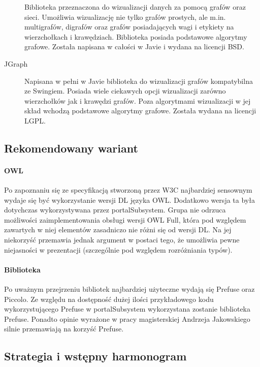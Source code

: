 \begin{description}
 Biblioteka przeznaczona do wizualizacji danych za pomocą grafów oraz sieci. Umożliwia wizualizację nie tylko grafów prostych, ale m.in. multigrafów, digrafów oraz grafów posiadających wagi i etykiety na wierzchołkach i krawędziach. Biblioteka posiada podstawowe algorytmy grafowe. Została napisana w całości w Javie i wydana na licencji BSD.
\item[JGraph]

 Napisana w pełni w Javie biblioteka do wizualizacji grafów kompatybilna ze Swingiem. Posiada wiele ciekawych opcji wizualizacji zarówno wierzchołków jak i krawędzi grafów. Poza algorytmami wizualizacji w jej skład wchodzą podstawowe algorytmy grafowe. Została wydana na licencji LGPL.
\end{description}



\subsection{Rekomendowany wariant}


\paragraph{OWL} Po zapoznaniu się ze specyfikacją stworzoną przez W3C najbardziej sensownym wydaje się być wykorzystanie wersji DL języka OWL. Dodatkowo wersja ta była dotychczas wykorzystywana przez portalSubsystem. Grupa nie odrzuca możliwości zaimplementowania obsługi wersji OWL Full, która pod względem zawartych w niej elementów zasadniczo nie różni się od wersji DL. Na jej niekorzyść przemawia jednak argument w postaci tego, że umożliwia pewne niejasności w prezentacji (szczególnie pod względem rozróżniania typów).

\paragraph{Biblioteka }Po uważnym przejrzeniu bibliotek najbardziej użyteczne wydają się Prefuse oraz Piccolo. Ze względu na dostępność dużej ilości przykładowego kodu wykorzystującego Prefuse w portalSubsystem wykorzystana zostanie biblioteka Prefuse. Ponadto opinie wyrażone w pracy magisterskiej Andrzeja Jakowskiego silnie przemawiają na korzyść Prefuse.


\subsection{Strategia i wstępny harmonogram}

